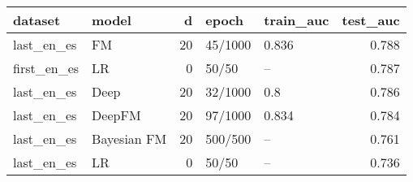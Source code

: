 \begin{tabular}{llrllr}
\toprule
     dataset &        model &   d &    epoch & train\_auc &  test\_auc \\
\midrule
  last\_en\_es &           FM &  20 &  45/1000 &     0.836 &     0.788 \\
 first\_en\_es &           LR &   0 &    50/50 &        -- &     0.787 \\
  last\_en\_es &         Deep &  20 &  32/1000 &       0.8 &     0.786 \\
  last\_en\_es &       DeepFM &  20 &  97/1000 &     0.834 &     0.784 \\
  last\_en\_es &  Bayesian FM &  20 &  500/500 &        -- &     0.761 \\
  last\_en\_es &           LR &   0 &    50/50 &        -- &     0.736 \\
\bottomrule
\end{tabular}
